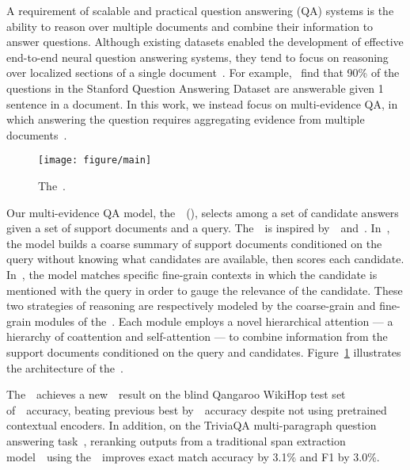 \documentclass{article} \usepackage{iclr2019_conference,times}
\begin{document}
A requirement of scalable and practical question answering (QA) systems is the ability to reason over multiple documents and combine their information to answer questions.
Although existing datasets enabled the development of effective end-to-end neural question answering systems, they tend to focus on reasoning over localized sections of a single document~\citep{hermann2015teaching,Rajpurkar2016SQuAD10,Rajpurkar2018SQuAD20,trischler2017newsqa}.
For example,~\citet{min2018efficient} find that 90\% of the questions in the Stanford Question Answering Dataset are answerable given 1 sentence in a document.
In this work, we instead focus on multi-evidence QA, in which answering the question requires aggregating evidence from multiple documents~\citep{welbl2018constructing,Joshi2017TriviaQA}.



\begin{figure}[t]
    \centering
    \texttt{[image: figure/main]}
    \caption{The~\modelname.}
    \label{fig:main}
    \vspace{-0.2cm}
\end{figure}

Our multi-evidence QA model, the~\modelname~(\modelnameshort), selects among a set of candidate answers given a set of support documents and a query.
The~\modelnameshort~is inspired by~\coarsereasoning~and~\finereasoning.
In~\coarsereasoning, the model builds a coarse summary of support documents conditioned on the query without knowing what candidates are available, then scores each candidate.
In~\finereasoning, the model matches specific fine-grain contexts in which the candidate is mentioned with the query in order to gauge the relevance of the candidate.
These two strategies of reasoning are respectively modeled by the coarse-grain and fine-grain modules of the~\modelnameshort.
Each module employs a novel hierarchical attention --- a hierarchy of coattention and self-attention --- to combine information from the support documents conditioned on the query and candidates.
Figure~\ref{fig:main} illustrates the architecture of the~\modelnameshort.

The~\modelnameshort~achieves a new~\sota~result on the blind Qangaroo WikiHop test set of~\testacc~accuracy, beating previous best by~\sotadiff~accuracy despite not using pretrained contextual encoders.
In addition, on the TriviaQA multi-paragraph question answering task~\citep{Joshi2017TriviaQA}, reranking outputs from a traditional span extraction model~\citep{clark2018simple}~using the~\modelnameshort~improves exact match accuracy by 3.1\% and F1 by 3.0\%.
\end{document}
